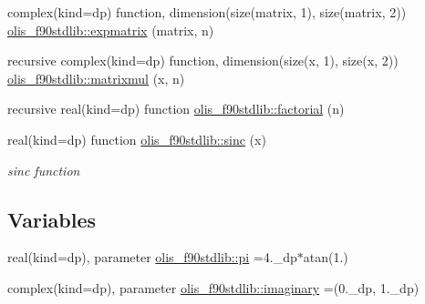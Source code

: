 \begin{DoxyCompactItemize}
complex(kind=dp) function, dimension(size(matrix, 1), size(matrix, 2)) \hyperlink{namespaceolis__f90stdlib_a309c2107f5d5071bb8c1bad4362f88e1}{olis\+\_\+f90stdlib\+::expmatrix} (matrix, n)
\item 
recursive complex(kind=dp) function, dimension(size(x, 1), size(x, 2)) \hyperlink{namespaceolis__f90stdlib_af70533a90b595522cd1bf47b37a2319d}{olis\+\_\+f90stdlib\+::matrixmul} (x, n)
\item 
recursive real(kind=dp) function \hyperlink{namespaceolis__f90stdlib_ad0e4f304a609e1d8c088778344f1aa67}{olis\+\_\+f90stdlib\+::factorial} (n)
\item 
real(kind=dp) function \hyperlink{namespaceolis__f90stdlib_a686d3815f56b261f358b016fe0ff8253}{olis\+\_\+f90stdlib\+::sinc} (x)
\begin{DoxyCompactList}\small\item\em sinc function \end{DoxyCompactList}\end{DoxyCompactItemize}
\subsection*{Variables}
\begin{DoxyCompactItemize}
\item 
real(kind=dp), parameter \hyperlink{namespaceolis__f90stdlib_a106e09303fbf05972f0635ff67f73c9d}{olis\+\_\+f90stdlib\+::pi} =4.\+\_\+dp$\ast$atan(1.)
\item 
complex(kind=dp), parameter \hyperlink{namespaceolis__f90stdlib_a0a22d30625256a14acc49cd749e88cb7}{olis\+\_\+f90stdlib\+::imaginary} =(0.\+\_\+dp, 1.\+\_\+dp)
\end{DoxyCompactItemize}
